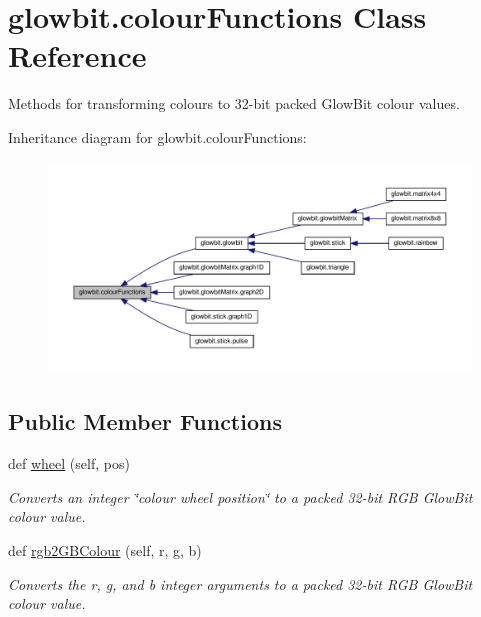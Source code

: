 \hypertarget{classglowbit_1_1colourFunctions}{}\section{glowbit.\+colour\+Functions Class Reference}
\label{classglowbit_1_1colourFunctions}


Methods for transforming colours to 32-\/bit packed Glow\+Bit colour values.  




Inheritance diagram for glowbit.\+colour\+Functions\+:\nopagebreak
\begin{figure}[H]
\begin{center}
\leavevmode
\includegraphics[width=350pt]{classglowbit_1_1colourFunctions__inherit__graph}
\end{center}
\end{figure}
\subsection*{Public Member Functions}
\begin{DoxyCompactItemize}
\item 
def \hyperlink{classglowbit_1_1colourFunctions_afb989958ec7aa4dfb7a04f359da5969a}{wheel} (self, pos)
\begin{DoxyCompactList}\small\item\em Converts an integer \char`\"{}colour wheel position\char`\"{} to a packed 32-\/bit R\+GB Glow\+Bit colour value. \end{DoxyCompactList}\item 
def \hyperlink{classglowbit_1_1colourFunctions_a1c24f694a16f3c721a0e7771740ebc56}{rgb2\+G\+B\+Colour} (self, r, g, b)
\begin{DoxyCompactList}\small\item\em Converts the r, g, and b integer arguments to a packed 32-\/bit R\+GB Glow\+Bit colour value. \end{DoxyCompactList}\end{DoxyCompactItemize}


